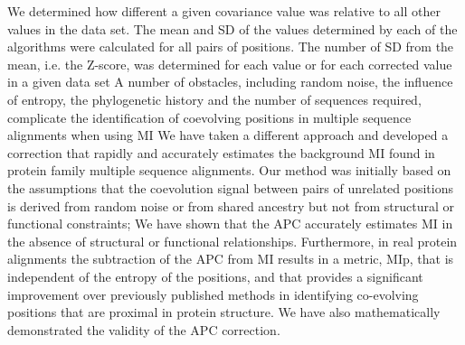 We determined how different a given covariance value was relative to all other values in the data set. The mean and SD of the values determined by each of the algorithms were calculated for all pairs of positions. The number of SD from the mean, i.e. the Z-score, was determined for each value or for each corrected value in a given data set \cite{dunn2008mutual}
A number of obstacles, including random noise, the influence of entropy, the phylogenetic history and the number of sequences required, complicate the identification of coevolving positions in multiple sequence alignments when using MI \cite{dunn2008mutual}
We have taken a different approach and developed a correction that rapidly and accurately estimates the background MI found in protein family multiple sequence alignments. Our method was initially based on the assumptions that the coevolution signal between pairs of unrelated positions is derived from random noise or from shared ancestry but not from structural or functional constraints;  \cite{dunn2008mutual}
We have shown that the APC accurately estimates MI in the absence of structural or functional relationships. Furthermore, in real protein alignments the subtraction of the APC from MI results in a metric, MIp, that is independent of the entropy of the positions, and that provides a significant improvement over previously published methods in identifying co-evolving positions that are proximal in protein structure. \cite{dunn2008mutual}
We have also mathematically demonstrated the validity of the APC correction. \cite{dunn2008mutual}


